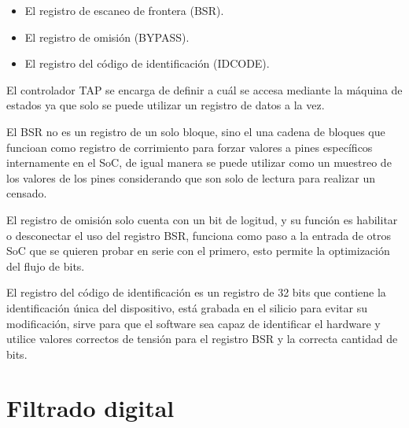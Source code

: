 \begin{itemize}
    \item El registro de escaneo de frontera (BSR).
    \item El registro de omisión (BYPASS).
    \item El registro del código de identificación (IDCODE).
\end{itemize}

El controlador TAP se encarga de definir a cuál se accesa mediante la máquina de estados ya 
que solo se puede utilizar un registro de datos a la vez. 
\cite{nelsonBoundaryScan, calvoTestingSesion4, jtagTechnologiesBoundaryScan, jtagTechnologiesTapController, ieee1149}

El BSR no es un registro de un solo bloque, sino el una cadena de bloques que funcioan como 
registro de corrimiento para forzar valores a pines específicos internamente en el SoC, de 
igual manera se puede utilizar como un muestreo  de los valores de los pines considerando que 
son solo de lectura para realizar un censado.
\cite{nelsonBoundaryScan, calvoTestingSesion4, jtagTechnologiesBoundaryScan, jtagTechnologiesTapController, ieee1149}

El registro de omisión solo cuenta con un bit de logitud, y su función es habilitar o 
desconectar el uso del registro BSR, funciona como paso a la entrada de otros SoC que se 
quieren probar en serie con el primero, esto permite la optimización del flujo de bits.  
\cite{nelsonBoundaryScan, calvoTestingSesion4, jtagTechnologiesBoundaryScan, jtagTechnologiesTapController, ieee1149}

El registro del código de identificación es un registro de 32 bits que contiene la 
identificación única del dispositivo, está grabada en el silicio para evitar su modificación, 
sirve para que el software sea capaz de identificar el hardware y utilice valores correctos de 
tensión para el registro BSR y la correcta cantidad de bits.
\cite{nelsonBoundaryScan, calvoTestingSesion4, jtagTechnologiesBoundaryScan, jtagTechnologiesTapController, ieee1149}

\section{Filtrado digital}

